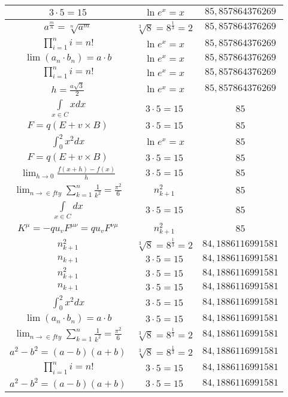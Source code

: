 \documentclass{article}
\begin{document}
\begin{flushleft}
\begin{longtable}{|c|c|c|}
$3\cdot 5=15$ & $\ln e^x=x$ & $85,857864376269$ \\ \hline 
$a^{\frac{m}{n}}=\sqrt[n]{a^{m}}$ & $\sqrt[3]{8}=8^{\frac{1}{3}}=2$ & $85,857864376269$ \\ \hline 
$\prod_{i=1}^ni=n!$ & $\ln e^x=x$ & $85,857864376269$ \\ \hline 
$\lim\left(a_n\cdot b_n\right)=a\cdot b$ & $\ln e^x=x$ & $85,857864376269$ \\ \hline 
$\prod_{i=1}^ni=n!$ & $\ln e^x=x$ & $85,857864376269$ \\ \hline 
$h=\frac{a\sqrt{3}}{2}$ & $\ln e^x=x$ & $85,857864376269$ \\ \hline 
$\int \limits_{x\in C}xdx$ & $3\cdot 5=15$ & $85$ \\ \hline 
$F=q\left(E+v\times B\right)$ & $3\cdot 5=15$ & $85$ \\ \hline 
$\int _0^2x^2dx$ & $\ln e^x=x$ & $85$ \\ \hline 
$F=q\left(E+v\times B\right)$ & $3\cdot 5=15$ & $85$ \\ \hline 
$\lim_{h\to0}\frac{f(x+h)-f(x)}{h}$ & $3\cdot 5=15$ & $85$ \\ \hline 
$\lim_{n\to\in fty}\sum_{k=1}^n\frac{1}{k^2}=\frac{\pi^2}{6}$ & $n_{k+1}^2$ & $85$ \\ \hline 
$\int \limits_{x\in C}dx$ & $3\cdot 5=15$ & $85$ \\ \hline 
$K^\mu=-qu_vF^{\mu\nu}=qu_vF^{\nu\mu}$ & $n_{k+1}^2$ & $85$ \\ \hline 
$n_{k+1}^2$ & $\sqrt[3]{8}=8^{\frac{1}{3}}=2$ & $84,1886116991581$ \\ \hline 
$n_{k+1}$ & $3\cdot 5=15$ & $84,1886116991581$ \\ \hline 
$n_{k+1}^2$ & $3\cdot 5=15$ & $84,1886116991581$ \\ \hline 
$n_{k+1}$ & $3\cdot 5=15$ & $84,1886116991581$ \\ \hline 
$\int _0^2x^2dx$ & $3\cdot 5=15$ & $84,1886116991581$ \\ \hline 
$\lim\left(a_n\cdot b_n\right)=a\cdot b$ & $3\cdot 5=15$ & $84,1886116991581$ \\ \hline 
$\lim_{n\to\in fty}\sum_{k=1}^n\frac{1}{k^2}=\frac{\pi^2}{6}$ & $\sqrt[3]{8}=8^{\frac{1}{3}}=2$ & $84,1886116991581$ \\ \hline 
$a^2-b^2=(a-b)(a+b)$ & $\sqrt[3]{8}=8^{\frac{1}{3}}=2$ & $84,1886116991581$ \\ \hline 
$\prod_{i=1}^ni=n!$ & $3\cdot 5=15$ & $84,1886116991581$ \\ \hline 
$a^2-b^2=(a-b)(a+b)$ & $3\cdot 5=15$ & $84,1886116991581$ \\ \hline 

\end{longtable}
\end{flushleft}
\end{document}
